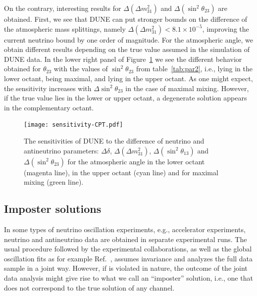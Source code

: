 On the contrary, interesting results for $\Delta(\Delta m_{31}^2)$ and $\Delta(\sin^2\theta_{23})$ are obtained. First, we see that  DUNE can put stronger bounds on the difference of the atmospheric mass splittings, namely $\Delta(\Delta m_{31}^2) < 8.1\times 10^{-5}$, improving the current neutrino bound by one order of magnitude. For the atmospheric angle, we obtain different results depending on the true value assumed in the simulation of DUNE data. In the lower right panel of Figure~\ref{fig:sensitivity-CPT} we see the different behavior obtained for $\theta_{23}$ with the values of $\sin^2\theta_{23}$ from table~\ref{tab:par2}, i.e., lying in the lower octant, being maximal, and lying in the upper octant.
As one might expect, the sensitivity increases with $\Delta\sin^2\theta_{23}$ in the case of maximal mixing. However, if the true value lies in the lower or upper octant, a degenerate solution appears in the complementary octant.
\begin{figure}[!htb]
 \centering
        \texttt{[image: sensitivity-CPT.pdf]}
        \caption[Sensitivities to the difference of neutrino and antineutrino parameters]{The sensitivities of DUNE to the difference of neutrino and antineutrino parameters: 
        $\Delta\delta$, $\Delta(\Delta m_{31}^2)$, $\Delta(\sin^2\theta_{13})$ and $\Delta(\sin^2\theta_{23})$  
        for the atmospheric angle in the lower octant (magenta line),  in the upper octant (cyan line) and for maximal mixing (green line).}
	\label{fig:sensitivity-CPT}
\end{figure}

\subsection{Imposter solutions}
\label{sec:impost}
In %
some types of neutrino oscillation experiments, e.g., accelerator experiments, neutrino and antineutrino data are obtained in separate experimental runs. The usual procedure followed by the experimental collaborations, as well as the global oscillation fits as for example Ref.~\cite{deSalas:2017kay}, assumes  invariance and analyzes the full data sample in a joint way.
However, if  is violated in nature, the outcome of the joint data analysis might give rise to what we call an ``imposter'' solution, i.e., one that does not correspond to the true solution of any channel. 

